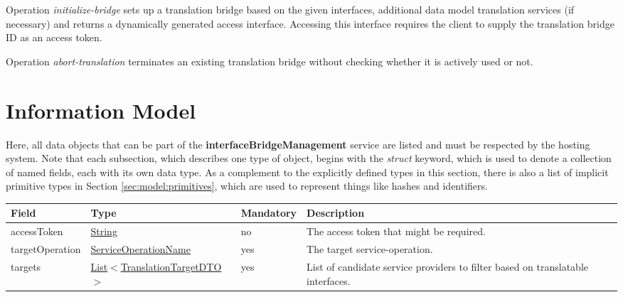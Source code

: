 \documentclass[a4paper]{arrowhead}
\newcommand{\pref}[1]{{\textcolor{ArrowheadGrey}{\hyperref[sec:model:primitives:#1]{#1}}}}
\begin{document}
Operation \textit{initialize-bridge} sets up a translation bridge based on the given interfaces, additional data model translation services (if necessary) and returns a dynamically generated access interface. Accessing this interface requires the client to supply the translation bridge ID as an access token.


Operation \textit{abort-translation} terminates an existing translation bridge without checking whether it is actively used or not.

\clearpage

\section{Information Model}
\label{sec:model}

Here, all data objects that can be part of the \textbf{interfaceBridgeManagement} service are listed and must be respected by the hosting system.
Note that each subsection, which describes one type of object, begins with the \textit{struct} keyword, which is used to denote a collection of named fields, each with its own data type.
As a complement to the explicitly defined types in this section, there is also a list of implicit primitive types in Section \ref{sec:model:primitives}, which are used to represent things like hashes and identifiers.

{}
 
\begin{table}[ht!]
\begin{tabularx}{\textwidth}{| p{3cm} | p{4.9cm} | p{2cm} | X |} \hline
\rowcolor{gray!33} Field & Type & Mandatory & Description \\ \hline
accessToken & \pref{String} & no & The access token that might be required. \\ \hline
targetOperation & \pref{ServiceOperationName} & yes & The target service-operation. \\ \hline
targets & \pref{List}$<$\hyperref[sec:model:TranslationTargetDTO]{TranslationTargetDTO}$>$ & yes & List of candidate service providers to filter based on translatable interfaces. \\ \hline
\end{tabularx}
\end{table}

 
\end{document}
